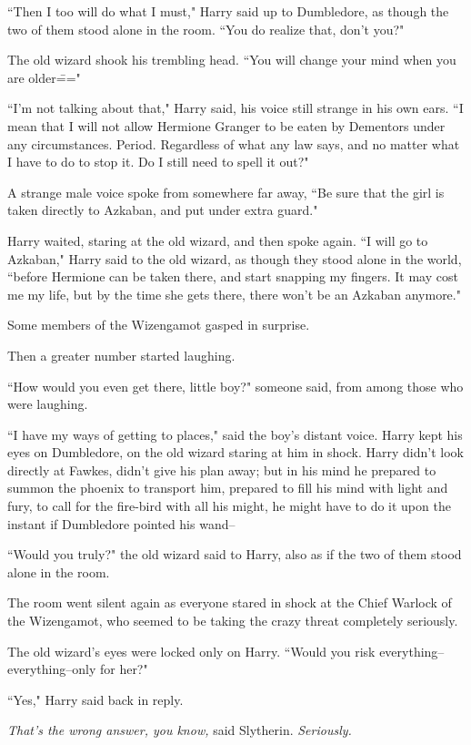 ``Then I too will do what I must," Harry said up to Dumbledore, as though the two of them stood alone in the room. ``You do realize that, don't you?"

The old wizard shook his trembling head. ``You will change your mind when you are older\==="

``I'm not talking about that," Harry said, his voice still strange in his own ears. ``I mean that I will not allow Hermione Granger to be eaten by Dementors under any circumstances. Period. Regardless of what any law says, and no matter what I have to do to stop it. Do I still need to spell it out?"

A strange male voice spoke from somewhere far away, ``Be sure that the girl is taken directly to Azkaban, and put under extra guard."

Harry waited, staring at the old wizard, and then spoke again. ``I will go to Azkaban," Harry said to the old wizard, as though they stood alone in the world, ``before Hermione can be taken there, and start snapping my fingers. It may cost me my life, but by the time she gets there, there won't be an Azkaban anymore."

Some members of the Wizengamot gasped in surprise.

Then a greater number started laughing.

``How would you even get there, little boy?" someone said, from among those who were laughing.

``I have my ways of getting to places," said the boy's distant voice. Harry kept his eyes on Dumbledore, on the old wizard staring at him in shock. Harry didn't look directly at Fawkes, didn't give his plan away; but in his mind he prepared to summon the phoenix to transport him, prepared to fill his mind with light and fury, to call for the fire-bird with all his might, he might have to do it upon the instant if Dumbledore pointed his wand\---

``Would you truly?" the old wizard said to Harry, also as if the two of them stood alone in the room.

The room went silent again as everyone stared in shock at the Chief Warlock of the Wizengamot, who seemed to be taking the crazy threat completely seriously.

The old wizard's eyes were locked only on Harry. ``Would you risk everything\---everything\---only for her?"

``Yes," Harry said back in reply.

\emph{That's the wrong answer, you know,} said Slytherin. \emph{Seriously.}

